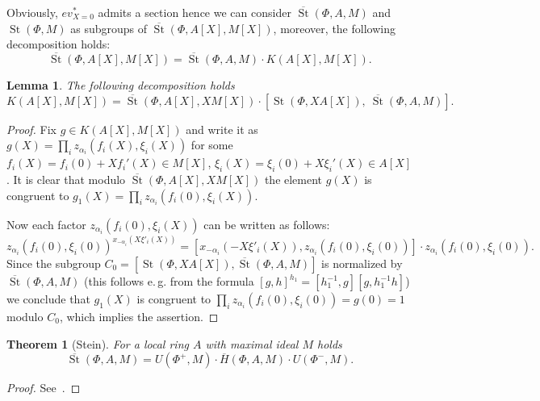 \documentclass[oneside, 8pt]{amsart}
\newtheorem{theorem}{Theorem}
\newtheorem{lemma}{Lemma}
\theoremstyle{remark}
\theoremstyle{definition}
\DeclareMathOperator{\St}{St}
\numberwithin{equation}{section}
\begin{document}
Obviously, $ev_{X=0}^*$ admits a section hence we can consider $\overline{\St}(\Phi, A, M)$ and $\St(\Phi, M)$ as subgroups of $\overline{\St}(\Phi, A[X], M[X])$,
 moreover, the following decomposition holds:
\begin{equation} \label{relZero-decomp} \overline{\St}(\Phi, A[X], M[X]) = \overline{\St}(\Phi, A, M) \cdot K(A[X], M[X]).\end{equation}
\begin{lemma} The following decomposition holds
 \[ K(A[X], M[X]) = \overline{\St}(\Phi, A[X], XM[X]) \cdot \left[\St(\Phi, XA[X]),\ \overline{\St}(\Phi, A, M)\right].\] \end{lemma}
\begin{proof} Fix $g \in K(A[X], M[X])$ and write it as $g(X) = \prod_i z_{\alpha_i}(f_i(X), \xi_i(X))$ for some $f_i(X) = f_i(0) + Xf_i'(X) \in M[X]$, $\xi_i(X) = \xi_i(0) + X\xi_i'(X) \in A[X]$.
 It is clear that modulo $\overline{\St}(\Phi, A[X], XM[X])$ the element $g(X)$ is congruent to $g_1(X) = \prod_i z_{\alpha_i}(f_i(0), \xi_i(X)).$ 
 
 Now each factor $z_{\alpha_i}(f_i(0), \xi_i(X))$ can be written as follows:
 \[z_{\alpha_i}(f_i(0), \xi_i(0))^{x_{-\alpha_i}(X\xi'_i(X))} = [x_{-\alpha_i}(-X\xi'_i(X)), z_{\alpha_i}(f_i(0), \xi_i(0))] \cdot z_{\alpha_i}(f_i(0), \xi_i(0)).\]
 Since the subgroup $C_0 = \left[\St(\Phi, XA[X]), \overline{\St}(\Phi, A, M)\right]$ is normalized by $\overline{\St}(\Phi, A, M)$ 
 (this follows e.\,g. from the formula $[g, h]^{h_1} = [h_1^{-1}, g][g, h_1^{-1}h]$) we conclude that $g_1(X)$ is congruent to $\prod_i z_{\alpha_i}(f_i(0), \xi_i(0)) = g(0) = 1$ modulo $C_0$,
 which implies the assertion. \qedhere \end{proof}

\begin{theorem}[Stein] \label{thmStein} For a local ring $A$ with maximal ideal $M$ holds \[\overline{\St}(\Phi, A, M) = U(\Phi^+, M) \cdot \overline{H}(\Phi, A, M) \cdot U(\Phi^-, M).\] \end{theorem} \begin{proof} See~\cite[Theorem~2.4]{Ste73}. \end{proof}
\end{document}
